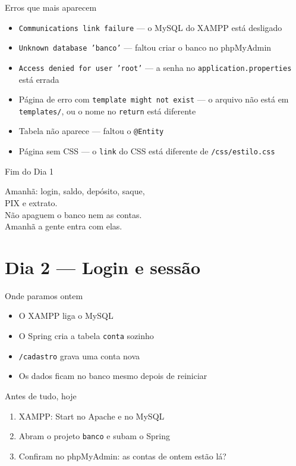 \documentclass[aspectratio=169,11pt]{beamer}
\begin{document}
\begin{frame}{Erros que mais aparecem}
  \begin{itemize}
    \item \texttt{Communications link failure} --- o MySQL do XAMPP
          está desligado
    \item \texttt{Unknown database 'banco'} --- faltou criar o banco
          no phpMyAdmin
    \item \texttt{Access denied for user 'root'} --- a senha no
          \texttt{application.properties} está errada
    \item Página de erro com \texttt{template might not exist} ---
          o arquivo não está em \texttt{templates/}, ou o nome no
          \texttt{return} está diferente
    \item Tabela não aparece --- faltou o \texttt{@Entity}
    \item Página sem CSS --- o \texttt{link} do CSS está diferente
          de \texttt{/css/estilo.css}
  \end{itemize}
\end{frame}

\begin{frame}{Fim do Dia 1}
  \begin{center}
    \Large Amanhã: login, saldo, depósito, saque,\\
    PIX e extrato.\\[0.8em]
    \normalsize
    Não apaguem o banco nem as contas.\\
    Amanhã a gente entra com elas.
  \end{center}
\end{frame}

\section{Dia 2 --- Login e sessão}

\begin{frame}{Onde paramos ontem}
  \begin{itemize}
    \item O XAMPP liga o MySQL
    \item O Spring cria a tabela \texttt{conta} sozinho
    \item \texttt{/cadastro} grava uma conta nova
    \item Os dados ficam no banco mesmo depois de reiniciar
  \end{itemize}

  \vspace{0.5em}
  \begin{block}{Antes de tudo, hoje}
    \begin{enumerate}
      \item XAMPP: Start no Apache e no MySQL
      \item Abram o projeto \texttt{banco} e subam o Spring
      \item Confiram no phpMyAdmin: as contas de ontem estão lá?
    \end{enumerate}
  \end{block}
\end{frame}
\end{document}
